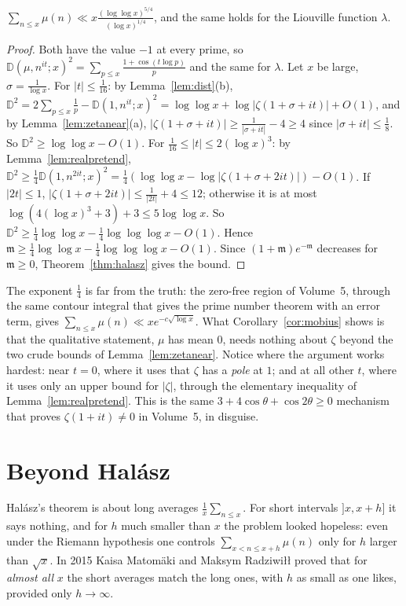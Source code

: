 \begin{corollary}\label{cor:mobius}
$\sum_{n\le x}\mu(n)\ll x\frac{(\log\log x)^{5/4}}{(\log x)^{1/4}}$, and the same holds for the Liouville function $\lambda$.
\end{corollary}
\begin{proof}
Both have the value $-1$ at every prime, so $\mathbb D(\mu,n^{it};x)^2=\sum_{p\le x}\frac{1+\cos(t\log p)}p$ and the same for $\lambda$. Let $x$ be large, $\sigma=\frac1{\log x}$.
For $|t|\le\frac1{16}$: by Lemma~\ref{lem:dist}(b), $\mathbb D^2=2\sum_{p\le x}\frac1p-\mathbb D(1,n^{it};x)^2=\log\log x+\log|\zeta(1+\sigma+it)|+O(1)$, and by Lemma~\ref{lem:zetanear}(a), $|\zeta(1+\sigma+it)|\ge\frac1{|\sigma+it|}-4\ge4$ since $|\sigma+it|\le\frac18$. So $\mathbb D^2\ge\log\log x-O(1)$.
For $\frac1{16}\le|t|\le2(\log x)^3$: by Lemma~\ref{lem:realpretend}, $\mathbb D^2\ge\frac14\mathbb D(1,n^{2it};x)^2=\frac14(\log\log x-\log|\zeta(1+\sigma+2it)|)-O(1)$. If $|2t|\le1$, $|\zeta(1+\sigma+2it)|\le\frac1{|2t|}+4\le12$; otherwise it is at most $\log(4(\log x)^3+3)+3\le5\log\log x$. So $\mathbb D^2\ge\frac14\log\log x-\frac14\log\log\log x-O(1)$.
Hence $\mathfrak m\ge\frac14\log\log x-\frac14\log\log\log x-O(1)$. Since $(1+\mathfrak m)e^{-\mathfrak m}$ decreases for $\mathfrak m\ge0$, Theorem~\ref{thm:halasz} gives the bound.
\end{proof}

The exponent $\frac14$ is far from the truth: the zero-free region of Volume~5, through the same contour integral that gives the prime number theorem with an error term, gives $\sum_{n\le x}\mu(n)\ll xe^{-c\sqrt{\log x}}$. What Corollary~\ref{cor:mobius} shows is that the qualitative statement, $\mu$ has mean $0$, needs nothing about $\zeta$ beyond the two crude bounds of Lemma~\ref{lem:zetanear}. Notice where the argument works hardest: near $t=0$, where it uses that $\zeta$ has a \emph{pole} at $1$; and at all other $t$, where it uses only an upper bound for $|\zeta|$, through the elementary inequality of Lemma~\ref{lem:realpretend}. This is the same $3+4\cos\theta+\cos2\theta\ge0$ mechanism that proves $\zeta(1+it)\ne0$ in Volume~5, in disguise.

\section{Beyond Halász}

Halász's theorem is about long averages $\frac1x\sum_{n\le x}$. For short intervals $]x,x+h]$ it says nothing, and for $h$ much smaller than $x$ the problem looked hopeless: even under the Riemann hypothesis one controls $\sum_{x<n\le x+h}\mu(n)$ only for $h$ larger than $\sqrt x$. In 2015 Kaisa Matomäki and Maksym Radziwiłł proved that for \emph{almost all} $x$ the short averages match the long ones, with $h$ as small as one likes, provided only $h\to\infty$.

